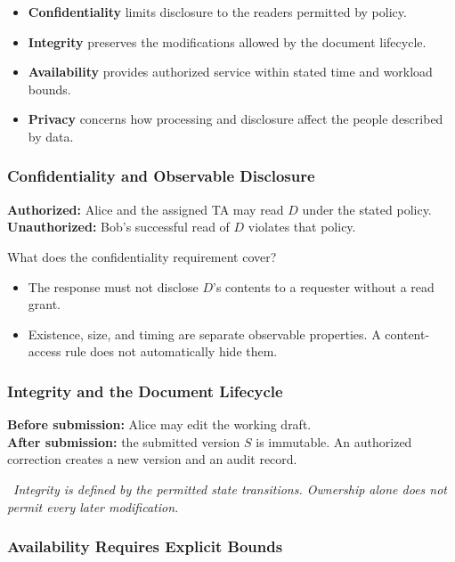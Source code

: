 \documentclass[hidelinks]{article}
\newcommand{\callout}[1]{\par\smallskip\noindent{\color{capri}$\blacktriangleright$}\ \textit{#1}\par\smallskip}
\begin{document}
\begin{itemize}
    \item \textbf{Confidentiality} limits disclosure to the readers permitted by policy.
    \item \textbf{Integrity} preserves the modifications allowed by the document lifecycle.
    \item \textbf{Availability} provides authorized service within stated time and workload bounds.
    \item \textbf{Privacy} concerns how processing and disclosure affect the people described by data.
\end{itemize}

\subsubsection{Confidentiality and Observable Disclosure}

\textbf{Authorized:} Alice and the assigned TA may read $D$ under the stated policy.\\
\textbf{Unauthorized:} Bob's successful read of $D$ violates that policy.

What does the confidentiality requirement cover?
\begin{itemize}
    \item The response must not disclose $D$'s contents to a requester without a read grant.
    \item Existence, size, and timing are separate observable properties. A content-access rule does not automatically hide them.
\end{itemize}

\subsubsection{Integrity and the Document Lifecycle}

\textbf{Before submission:} Alice may edit the working draft.\\
\textbf{After submission:} the submitted version $S$ is immutable. An authorized correction creates a new version and an audit record.

\callout{Integrity is defined by the permitted state transitions. Ownership alone does not permit every later modification.}

\subsubsection{Availability Requires Explicit Bounds}
\end{document}
